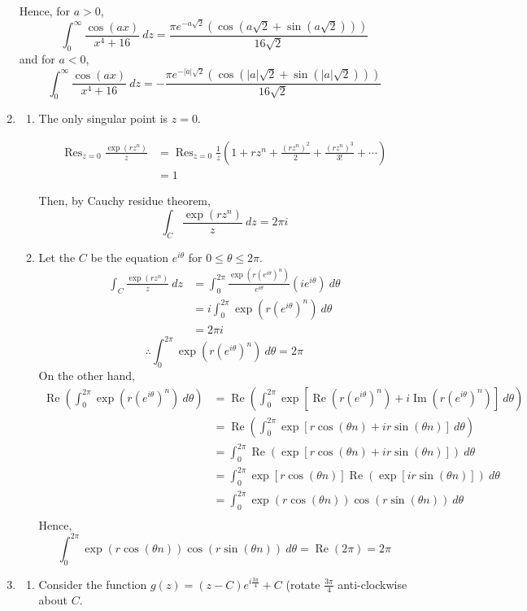 \documentclass{article}
\newcommand{\paren}[1]{\left(#1\right)}
\DeclareMathOperator{\real}{Re}
\DeclareMathOperator{\imm}{Im}
\DeclareMathOperator{\Res}{Res}
\begin{document}
\begin{enumerate}
Hence, for $a>0$,
\[
\int_{0}^\infty \frac{\cos (ax)}{x^4 + 16}\ dz = \frac{\pi e^{-a\sqrt{2}}(\cos(a\sqrt{2} + \sin(a\sqrt{2})))}{16\sqrt{2}}
\]
and for $a<0$,
\[
\int_{0}^\infty \frac{\cos (ax)}{x^4 + 16}\ dz = -\frac{\pi e^{-|a|\sqrt{2}}(\cos(|a|\sqrt{2} + \sin(|a|\sqrt{2})))}{16\sqrt{2}}
\]
\item
\begin{enumerate}
\item The only singular point is $z=0$.

\begin{align*}
\Res_{z=0} \frac{\exp(rz^n)}{z} &= \Res_{z=0} \frac{1}{z} (1 + rz^n + \frac{(rz^n)^2}{2} + \frac{(rz^n)^3}{3!} + \cdots) \\
    &= 1
\end{align*}

Then, by Cauchy residue theorem,
\[
\int_C \frac{\exp(rz^n)}{z}\ dz = 2\pi i
\]
\item Let the $C$ be the equation $e^{i\theta}$ for $0 \leq \theta \leq 2\pi$.
\begin{align*}
\int_C \frac{\exp(rz^n)}{z}\ dz &= \int_{0}^{2\pi} \frac{\exp(r(e^{i\theta})^n)}{e^{i\theta}} (ie^{i\theta})\ d\theta \\
    &= i \int_{0}^{2\pi} \exp(r(e^{i\theta})^n) \ d\theta \\
    &= 2\pi i
\end{align*}
\[
\therefore \int_{0}^{2\pi} \exp(r(e^{i\theta})^n) \ d\theta = 2\pi
\]
On the other hand,
\begin{align*}
\real \paren{\int_{0}^{2\pi} \exp(r(e^{i\theta})^n) \ d\theta} &= \real \paren{\int_{0}^{2\pi} \exp[\real(r(e^{i\theta})^n) + i\imm(r(e^{i\theta})^n)] \ d\theta} \\
    &= \real \paren{\int_{0}^{2\pi} \exp[r \cos(\theta n) + ir \sin(\theta n)] \ d\theta} \\
    &= \int_{0}^{2\pi} \real \paren{\exp[r \cos(\theta n) + ir \sin(\theta n)]} \ d\theta \\
    &= \int_{0}^{2\pi} \exp[r \cos(\theta n)] \real \paren{\exp[ir \sin(\theta n)]} \ d\theta \\
    &= \int_{0}^{2\pi} \exp(r \cos(\theta n)) \cos(r \sin(\theta n)) \ d\theta \\
\end{align*}
Hence,
\[\int_{0}^{2\pi} \exp(r \cos(\theta n)) \cos(r \sin(\theta n)) \ d\theta = \real(2\pi) = 2\pi\]
\end{enumerate}
\item
\begin{enumerate}
\item Consider the function $g(z) = (z - C)e^{i\frac{3\pi}{4}} + C$ (rotate $\frac{3\pi}{4}$ anti-clockwise about $C$.


\end{enumerate}
\end{enumerate}
\end{document}
